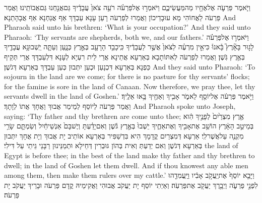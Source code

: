 {וַיֹּ֧אמֶר פַּרְעֹ֛ה אֶל\maqqaf אֶחָ֖יו מַה\maqqaf מַּעֲשֵׂיכֶ֑ם וַיֹּאמְר֣וּ אֶל\maqqaf פַּרְעֹ֗ה רֹעֵ֥ה צֹאן֙ עֲבָדֶ֔יךָ גַּם\maqqaf אֲנַ֖חְנוּ גַּם\maqqaf אֲבוֹתֵֽינוּ׃}
{וַאֲמַר פַּרְעֹה לַאֲחוֹהִי מָא עוּבָדֵיכוֹן וַאֲמַרוּ לְפַרְעֹה רָעַן עָנָא עַבְדָּךְ אַף אֲנַחְנָא אַף אֲבָהָתַנָא׃}
{And Pharaoh said unto his brethren: ‘What is your occupation?’ And they said unto Pharaoh: ‘Thy servants are shepherds, both we, and our fathers.’}{}
{וַיֹּאמְר֣וּ אֶל\maqqaf פַּרְעֹ֗ה לָג֣וּר בָּאָ֘רֶץ֮ בָּ֒אנוּ֒ כִּי\maqqaf אֵ֣ין מִרְעֶ֗ה לַצֹּאן֙ אֲשֶׁ֣ר לַעֲבָדֶ֔יךָ כִּֽי\maqqaf כָבֵ֥ד הָרָעָ֖ב בְּאֶ֣רֶץ כְּנָ֑עַן וְעַתָּ֛ה יֵֽשְׁבוּ\maqqaf נָ֥א עֲבָדֶ֖יךָ בְּאֶ֥רֶץ גֹּֽשֶׁן׃}
{וַאֲמַרוּ לְפַרְעֹה לְאִתּוֹתָבָא בְּאַרְעָא אֲתֵינָא אֲרֵי לֵית רִעְיָא לְעָנָא דִּלְעַבְדָּךְ אֲרֵי תְּקֵיף כַּפְנָא בְּאַרְעָא דִּכְנָעַן וּכְעַן יִתְּבוּן כְּעַן עַבְדָּךְ בְּאַרְעָא דְּגֹשֶׁן׃}
{And they said unto Pharaoh: ‘To sojourn in the land are we come; for there is no pasture for thy servants’ flocks; for the famine is sore in the land of Canaan. Now therefore, we pray thee, let thy servants dwell in the land of Goshen.’}{}
{וַיֹּ֣אמֶר פַּרְעֹ֔ה אֶל\maqqaf יוֹסֵ֖ף לֵאמֹ֑ר אָבִ֥יךָ וְאַחֶ֖יךָ בָּ֥אוּ אֵלֶֽיךָ׃}
{וַאֲמַר פַּרְעֹה לְיוֹסֵף לְמֵימַר אֲבוּךְ וַאֲחָךְ אֲתוֹ לְוָתָךְ׃}
{And Pharaoh spoke unto Joseph, saying: ‘Thy father and thy brethren are come unto thee;}{}
{אֶ֤רֶץ מִצְרַ֙יִם֙ לְפָנֶ֣יךָ הִ֔וא בְּמֵיטַ֣ב הָאָ֔רֶץ הוֹשֵׁ֥ב אֶת\maqqaf אָבִ֖יךָ וְאֶת\maqqaf אַחֶ֑יךָ יֵשְׁבוּ֙ בְּאֶ֣רֶץ גֹּ֔שֶׁן וְאִם\maqqaf יָדַ֗עְתָּ וְיֶשׁ\maqqaf בָּם֙ אַנְשֵׁי\maqqaf חַ֔יִל וְשַׂמְתָּ֛ם שָׂרֵ֥י מִקְנֶ֖ה עַל\maqqaf אֲשֶׁר\maqqaf לִֽי׃}
{אַרְעָא דְּמִצְרַיִם קֳדָמָךְ הִיא בִּדְשַׁפִּיר בְּאַרְעָא אוֹתֵיב יָת אֲבוּךְ וְיָת אֲחָךְ יִתְּבוּן בְּאַרְעָא דְּגֹשֶׁן וְאִם יְדַעְתְּ וְאִית בְּהוֹן גּוּבְרִין דְּחֵילָא וּתְמַנֵּינוּן רַבָּנֵי גֵּיתֵי עַל דִּילִי׃}
{the land of Egypt is before thee; in the best of the land make thy father and thy brethren to dwell; in the land of Goshen let them dwell. And if thou knowest any able men among them, then make them rulers over my cattle.’}{}
{וַיָּבֵ֤א יוֹסֵף֙ אֶת\maqqaf יַֽעֲקֹ֣ב אָבִ֔יו וַיַּֽעֲמִדֵ֖הוּ לִפְנֵ֣י פַרְעֹ֑ה וַיְבָ֥רֶךְ יַעֲקֹ֖ב אֶת\maqqaf פַּרְעֹֽה׃}
{וְאַיְתִי יוֹסֵף יָת יַעֲקֹב אֲבוּהִי וַאֲקִימֵיהּ קֳדָם פַּרְעֹה וּבָרֵיךְ יַעֲקֹב יָת פַּרְעֹה׃}
